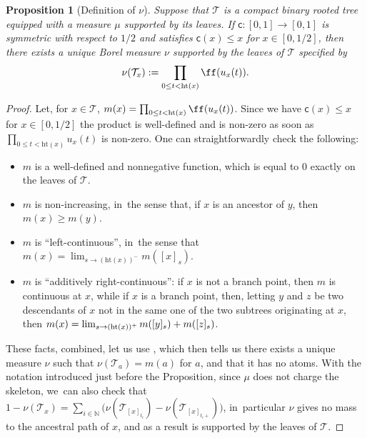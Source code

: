 \documentclass[JEP,XML,SOM,Unicode,NoFloatCountersInSection, NoEqCountersInSection,published]{cedram}
\newcommand{\T}{\mathcal{T}}\let\CRT\T\let\tbr\T
\newcommand{\h}{\mathrm{ht}}
\newtheorem{prop}[thm]{Proposition}
\theoremstyle{definition}
\begin{document}
\begin{prop}[Definition of $\nu$]\label{prop:def:nu} Suppose that $ \mathcal{T}$ is a compact binary rooted tree equipped with a measure $\mu$ supported by its leaves. If $\mathsf{c}:[0,1] \to [0,1]$ is symmetric with respect to $1/2$ and satisfies $ \mathsf{c}(x) \leq x$ for $x \in [0,1/2]$, then there exists a unique Borel measure $\nu$ supported by the leaves of $ \mathcal{T}$ specified by
\begin{equation} \nu(\T_x) := \prod_{0 \leq t < \h(x)} \ff(u_x(t)).
\end{equation}
\end{prop}
\begin{proof} Let, for $x\in\T$, $m(x)=\prod_{0 \leq t < \h(x)} \ff(u_x(t))$. Since we have $ \mathsf{c}(x) \leq x$ for $x \in [0,1/2]$ the product is well-defined and is non-zero as soon as $\prod_{0 \leq t < \h(x)} u_x(t)$ is non-zero. One can straightforwardly check the following:
\begin{itemize}
\item $m$ is a well-defined and nonnegative function, which is equal to $0$ exactly on the leaves of $ \mathcal{T}$.
\item $m$ is non-increasing, in~the sense that, if $x$ is an ancestor of $y$, then $m(x)\geq m(y)$.
\item $m$ is ``left-continuous'', in~the sense that $m(x)=\lim_{s\to (\mathrm{ht}(x))^{-}} m([x]_s)$.
\item $m$ is ``additively right-continuous'': if $x$ is not a branch point, then $m$ is continuous at $x$, while if $x$ is a branch point, then, letting $y$ and $z$ be two descendants of $x$ not in the same one of the two subtrees originating at $x$, then $m(x)= \lim_{s\to (\mathrm{ht}(x))^+} m([y]_s)+\nobreak m([z]_s)$.
\end{itemize}
These facts, combined, let us use \cite[Prop.\,1]{Steph13}, which then tells us there exists a unique measure $\nu$ such that $\nu(\T_a)=m(a)$ for $a$, and that it has no atoms. With the notation introduced just before the Proposition, since $\mu$ does not charge the skeleton, we~can also check that $1-\nu(\mathcal{T}_x) = \sum_{i \in \mathbb{N}} \big(\nu (\mathcal{T}_{[x]_{t_i}}) -\nu (\mathcal{T}_{[x]_{t_i +}})\big)$, in~particular $\nu$ gives no mass to the ancestral path of $x$, and as a result is supported by the leaves of $ \mathcal{T}$.
\end{proof}
\end{document}
